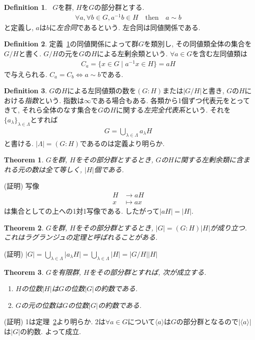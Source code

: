 \documentclass{article}
\theoremstyle{plain}
\newtheorem{theorem}{Theorem}
\theoremstyle{definition}
\newtheorem{definition}{Definition}
\theoremstyle{plain}
\numberwithin{equation}{section}
\numberwithin{theorem}{section}
\numberwithin{definition}{section}
\numberwithin{note}{section}
\begin{document}
\begin{definition}~\label{def::sim}
     $G$を群, $H$を$G$の部分群とする.
     \begin{align}
          \forall a,\forall b\in G, a^{-1}b\in H\quad\mathrm{then}\quad a\sim b
     \end{align}
     と定義し, $a$は$b$に\emph{左合同}であるという. 左合同は同値関係である. 
\end{definition}
\begin{definition}
     定義~\ref{def::sim}の同値関係によって群$G$を類別し, その同値類全体の集合を$G/H$と書く. $G/H$の元を$G$の$H$による左剰余類という. $\forall a\in G$を含む左同値類は
     \begin{align}
          C_a=\lbrace x\in G\mid a^{-1}x\in H\rbrace=aH
     \end{align}
     で与えられる. $C_a=C_b\iff a\sim b$である.
\end{definition}
\begin{definition}
     $G$の$H$による左同値類の数を$(G:H)$または$\lvert G/H\rvert$と書き, $G$の$H$における\emph{指数}という. 指数は$\infty$である場合もある. 各類から1個ずつ代表元をとってきて, それら全体のなす集合を$G$の$H$に関する\emph{左完全代表系}という. それを$\lbrace a_\lambda\rbrace_{\lambda \in \Lambda}$とすれば
     \begin{align}
          G=\bigcup_{\lambda\in \Lambda} a_\lambda H
     \end{align}
     と書ける. $\lvert \Lambda\rvert=(G:H)$であるのは定義より明らか.
\end{definition}
\begin{theorem}
     $G$を群, $H$をその部分群とするとき, $G$の$H$に関する左剰余類に含まれる元の数は全て等しく, $\lvert H\rvert$個である.
\end{theorem}
(証明) 写像
\begin{align}
     H&\to aH\\
     x&\mapsto ax
\end{align}
は集合としての上への1対1写像である. したがって$\lvert aH\rvert =\lvert H\rvert$.
\begin{theorem}\label{them::lagrange}
     $G$を群, $H$をその部分群とするとき, $\lvert G\rvert=(G:H)\lvert H\rvert$が成り立つ. これはラグランジュの定理と呼ばれることがある.
\end{theorem}
(証明) $\lvert G\rvert=\bigcup_{\lambda\in \Lambda}\lvert a_\lambda H\rvert=\bigcup_{\lambda \in \Lambda}\lvert H\rvert=\lvert G/H\rvert \lvert H\rvert$

\begin{theorem}
     $G$を有限群, $H$をその部分群とすれば, 次が成立する.
     \begin{enumerate}
          \item $H$の位数$\lvert H\rvert$は$G$の位数$\lvert G\rvert$の約数である.
          \item $G$の元の位数は$G$の位数$\lvert G\rvert$の約数である.
     \end{enumerate}
\end{theorem}
(証明) 1は定理~\ref{them::lagrange}より明らか.
2は$\forall a\in G$について$\langle a\rangle$は$G$の部分群となるので$\lvert \langle a\rangle \rvert$は$\lvert G\rvert$の約数. よって成立.
\end{document}

